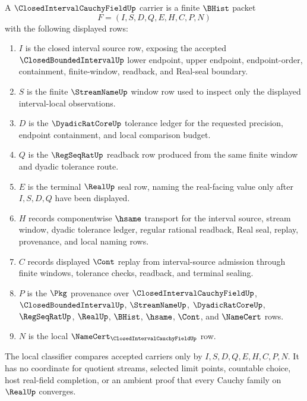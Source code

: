 \begin{definition}\label{def:closed-interval-cauchy-field-carrier}
A $\ClosedIntervalCauchyFieldUp$ carrier is a finite $\BHist$ packet
$$
F=(I,S,D,Q,E,H,C,P,N)
$$
with the following displayed rows:
\begin{enumerate}
\item $I$ is the closed interval source row, exposing the accepted $\ClosedBoundedIntervalUp$ lower endpoint, upper endpoint, endpoint-order, containment, finite-window, readback, and Real-seal boundary.
\item $S$ is the finite $\StreamNameUp$ window row used to inspect only the displayed interval-local observations.
\item $D$ is the $\DyadicRatCoreUp$ tolerance ledger for the requested precision, endpoint containment, and local comparison budget.
\item $Q$ is the $\RegSeqRatUp$ readback row produced from the same finite window and dyadic tolerance route.
\item $E$ is the terminal $\RealUp$ seal row, naming the real-facing value only after $I,S,D,Q$ have been displayed.
\item $H$ records componentwise $\hsame$ transport for the interval source, stream window, dyadic tolerance ledger, regular rational readback, Real seal, replay, provenance, and local naming rows.
\item $C$ records displayed $\Cont$ replay from interval-source admission through finite windows, tolerance checks, readback, and terminal sealing.
\item $P$ is the $\Pkg$ provenance over $\ClosedIntervalCauchyFieldUp$, $\ClosedBoundedIntervalUp$, $\StreamNameUp$, $\DyadicRatCoreUp$, $\RegSeqRatUp$, $\RealUp$, $\BHist$, $\hsame$, $\Cont$, and $\NameCert$ rows.
\item $N$ is the local $\NameCert_{\ClosedIntervalCauchyFieldUp}$ row.
\end{enumerate}
The local classifier compares accepted carriers only by $I,S,D,Q,E,H,C,P,N$. It has no coordinate for quotient streams, selected limit points, countable choice, host real-field completion, or an ambient proof that every Cauchy family on $\RealUp$ converges.
\end{definition}

